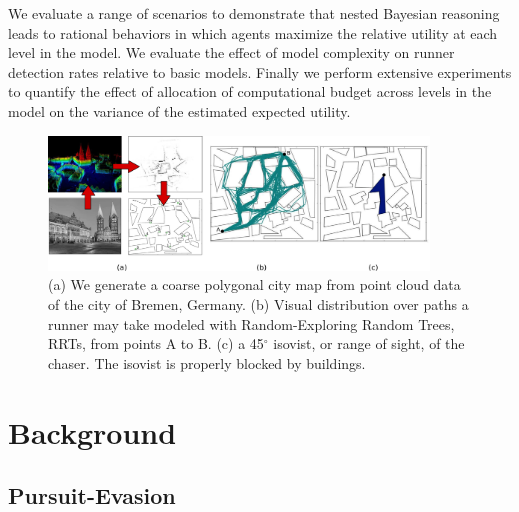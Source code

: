 \documentclass{article}
\begin{document}
We evaluate a range of scenarios to demonstrate that nested Bayesian reasoning leads to rational behaviors in which agents maximize the relative utility at each level in the model. We evaluate the effect of model complexity on runner detection rates relative to basic models. Finally we perform extensive experiments to quantify the effect of allocation of computational budget across levels in the model on the variance of the estimated expected utility. 


\begin{figure}
\begin{center}
\vspace{-1.0em}
\centerline{\includegraphics[width=0.9\textwidth]{sim_primitives.pdf}}
\caption{(a) We generate a coarse polygonal city map from point cloud data of the city of Bremen, Germany. (b) Visual distribution over paths a runner may take
modeled with Random-Exploring Random Trees, RRTs, from points A to B. (c) a 45$^{\circ}$ isovist, or range of sight, of the
chaser.  The isovist is properly blocked by buildings.}
\label{fig:rrt}
\end{center}
\vspace{-1.0em}
\end{figure} 

\section{Background}


\subsection{Pursuit-Evasion}
\end{document}
